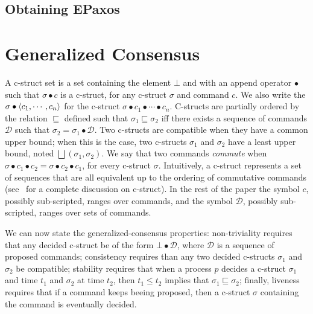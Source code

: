 \begin{comment}
\textbf{Lemma 3}
Consider $g_1$ and $g_2$. Assume that if $v\in V\left( g_1 \right)$ and $v\in V\left( g_2 \right)$ then $n\left( g_1 \right)=n\left( g2 \right)$.

\textbf{Lemma 4}
If $m_p\subseteq m_q$

\end{comment}

\subsection{Obtaining EPaxos}

\printbibliography%

\appendix

\section{Generalized Consensus}

A c-struct set is a set containing the element $\bot$ and with an append operator $\bullet$ such that $\sigma \bullet c$ is a c-struct, for any c-struct $\sigma$ and command $c$. 
We also write the $\sigma\bullet\left\langle c_1,\cdots,c_n\right\rangle$ for the c-struct $\sigma\bullet c_1\bullet\cdots\bullet c_n$.
C-structs are partially ordered by the relation $\sqsubseteq$ defined such that $\sigma_1\sqsubseteq\sigma_2$ iff there exists a sequence of commands $\mathcal{D}$ such that $\sigma_2=\sigma_1\bullet \mathcal{D}$. Two c-structs are compatible when they have a common upper bound; when this is the case, two c-structs $\sigma_1$ and $\sigma_2$ have a least upper bound, noted $\bigsqcup\left( \sigma_1,\sigma_2 \right)$.
We say that two commands \textit{commute} when $\sigma\bullet c_1\bullet c_2 =  \sigma\bullet c_2\bullet c_1 $, for every c-struct $\sigma$. Intuitively, a c-struct represents a set of sequences that are all equivalent up to the ordering of commutative commands (see~\cite{Lamport05GeneralizeConsensus} for a complete discussion on c-struct). 
In the rest of the paper the symbol $c$, possibly sub-scripted, ranges over commands, and the symbol $\mathcal{D}$, possibly sub-scripted, ranges over sets of commands.

We can now state the generalized-consensus properties: non-triviality requires that any decided c-struct be of the form $\bot\bullet \mathcal{D}$, where $\mathcal{D}$ is a sequence of proposed commands; consistency requires than any two decided c-structs $\sigma_1$ and $\sigma_2$ be compatible; stability requires that when a process $p$ decides a c-struct $\sigma_1$ and time $t_1$ and $\sigma_2$ at time $t_2$, then $t_1 \leq t_2$ implies that $\sigma_1\sqsubseteq \sigma_2$; finally, liveness requires that
if a command keeps beeing proposed, then a c-struct $\sigma$ containing the command is eventually decided.

